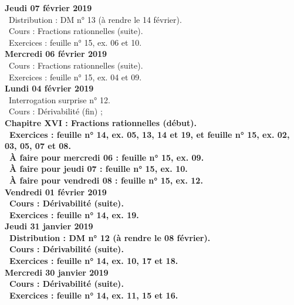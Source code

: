 \documentclass[12pt,a4paper]{article}
\begin{document}
\noindent\textbf{Jeudi 07 février 2019}\\
\bu\ Distribution : DM n° 13 (à rendre le 14 février).\\
\bu\ Cours : Fractions rationnelles (suite).\\
\bu\ Exercices : feuille n° 15, ex. 06 et 10.\vspace{.4cm}\\
 
\noindent\textbf{Mercredi 06 février 2019} \\
\bu\ Cours : Fractions rationnelles (suite).\\
\bu\ Exercices : feuille n° 15, ex. 04 et 09.\vspace{.4cm}\\
 
\noindent\textbf{\bf Lundi 04 février 2019} \\
\bu\ Interrogation surprise n° 12.\\
\bu\ Cours :  Dérivabilité (fin) ;\\
\bf Chapitre XVI \rm : Fractions rationnelles (début).\\
\bu\ Exercices : feuille n° 14, ex. 05, 13, 14 et 19, et feuille n° 15, ex. 02, 03, 05, 07 et 08.\\
\bu\ À faire pour mercredi 06 : feuille n° 15, ex. 09.\\
\bu\ À faire pour jeudi 07 : feuille n° 15, ex. 10.\\
\bu\ À faire pour vendredi 08 : feuille n° 15, ex. 12.\vspace{.4cm}\\
 
\noindent\textbf{Vendredi 01 février 2019}\\
\bu\ Cours : Dérivabilité (suite).\\
\bu\ Exercices : feuille n° 14, ex. 19.\vspace{.4cm}\\
 
\noindent\textbf{Jeudi 31 janvier 2019}\\
\bu\ Distribution : DM n° 12 (à rendre le 08 février).\\
\bu\ Cours : Dérivabilité (suite).\\
\bu\ Exercices : feuille n° 14, ex. 10, 17 et 18.\vspace{.4cm}\\
 
\noindent\textbf{Mercredi 30 janvier 2019} \\
\bu\ Cours : Dérivabilité (suite).\\
\bu\ Exercices : feuille n° 14, ex. 11, 15 et 16.\vspace{.4cm}\\
 
\end{document}
